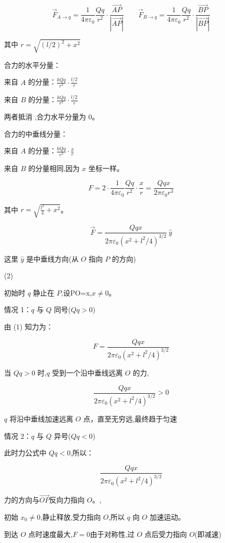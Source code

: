 \documentclass{article}
\begin{document}
$$ \vec{F}_{A \to q} = \frac{1}{4\pi\varepsilon_0}\frac{Q q}{r^2} \cdot \frac{\overrightarrow{AP}}{|\overrightarrow{AP}|} \qquad \vec{F}_{B \to q} = \frac{1}{4\pi\varepsilon_0}\frac{Q q}{r^2} \cdot \frac{\overrightarrow{BP}}{|\overrightarrow{BP}|} $$

其中 $ r = \sqrt{(l/2)^2 + x^2} $

合力的水平分量：

来自 $ A $ 的分量：$ \frac{k Q q}{r^2} \cdot \frac{l/2}{r} $  

来自 $ B $ 的分量：$ \frac{k Q q}{r^2} \cdot \frac{l/2}{r} $  

两者抵消 ,合力水平分量为 0。

合力的中垂线分量：

来自 $ A $ 的分量：$ \frac{k Q q}{r^2} \cdot \frac{x}{r} $  

来自 $ B $ 的分量相同,因为 $ x $ 坐标一样。  

$$F = 2 \cdot \frac{1}{4\pi\varepsilon_0}\frac{ Q q}{r^2} \cdot \frac{x}{r} =\frac{Q q x}{2\pi\varepsilon_0r^3}$$

其中 $ r = \sqrt{\frac{l^2}{4} + x^2} $。

$$\vec{F} = \frac{Qqx}{2\pi\varepsilon_0(x^2+l^2/4)^{3/2}} \ \hat{y}$$

这里 $ \hat{y} $ 是中垂线方向(从 $ O $ 指向 $ P $ 的方向)

\newpage
(2) 

初始时 $ q $ 静止在 $ P $,设PO=x,$ x \neq 0 $。

情况 1：$ q $ 与 $ Q $ 同号($ Q q > 0 $)

由 (1) 知力为：

$$F =\frac{Qqx}{2\pi\varepsilon_0(x^2+l^2/4)^{3/2}} $$

当 $ Q q > 0 $ 时,$ q $ 受到一个沿中垂线远离 $ O $ 的力,

$$\frac{Qqx}{2\pi\varepsilon_0(x^2+l^2/4)^{3/2}} >0$$

$ q $ 将沿中垂线加速远离 $ O $ 点，直至无穷远,最终趋于匀速

情况 2：$ q $ 与 $ Q $ 异号($ Q q < 0 $)

此时力公式中 $ Q q < 0 $,所以：

$$\frac{Qqx}{2\pi\varepsilon_0(x^2+l^2/4)^{3/2}} $$

力的方向与$\vec{OP}$反向力指向 $ O $。,

初始 $ x_0 \neq 0 $,静止释放,受力指向 $ O $,所以 $ q $ 向 $ O $ 加速运动。  

到达 $ O $ 点时速度最大,$F=0$由于对称性,过 $ O $ 点后受力指向 $ O $(即减速)
\end{document}
